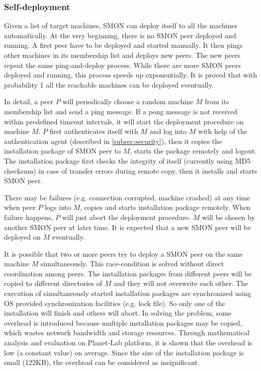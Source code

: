 \subsubsection{Self-deployment}

Given a list of target machines, SMON can deploy itself to
all the machines automatically. At the very beginning, there
is no SMON peer deployed and running. A first peer have
to be deployed and started manually. It then pings other
machines in its membership list and deploys new peers. The
new peers repeat the same ping-and-deploy process. While
there are more SMON peers deployed and running, this process
speeds up exponentially. It is proved that with probability
1 all the reachable machines can be deployed
eventually\cite{Eugster2004}.


In detail, a peer $P$ will periodically choose a random
machine $M$ from its membership list and send a ping
message. If a pong message is not received within predefined
timeout intervals, it will start the deployment procedure on
machine $M$. $P$ first authenticates itself with $M$ and
log into $M$ with help of the authentication agent
(described in \ref{subsec:security}), then it copies the
installation package of SMON peer to $M$, starts the package
remotely and logout. The installation package first
checks the integrity of itself (currently using MD5 checksum)
in case of transfer errors during remote copy, then it
installs and starts SMON peer.

There may be failures (e.g. connection corrupted, machine
crashed) at any time when peer $P$ logs
into $M$, copies and starts installation package remotely.
When failure happens, $P$ will just abort the deployment
procedure. $M$ will be chosen by another SMON peer at later
time. It is expected that a new SMON peer will be deployed
on $M$ eventually.

It is possible that two or more peers try to deploy a SMON
peer on the same machine $M$ simultaneously. This
race-condition is solved without direct coordination among
peers. The installation packages from different peers will
be copied to different directories of $M$ and they will not
overwrite each other. The execution of simultaneously
started installation packages are synchronized using OS
provided synchronization facilities (e.g. lock file). So
only one of the installation will finish and others will
abort.  In solving the problem, some overhead is introduced
because multiple installation packages may be copied, which
wastes network bandwidth and storage resources. Through
mathematical analysis and evaluation on Planet-Lab platform,
it is shown that the overhead is low (a constant value) on
average. Since the size of the installation package is small
(122KB), the overhead can be considered as insignificant.

